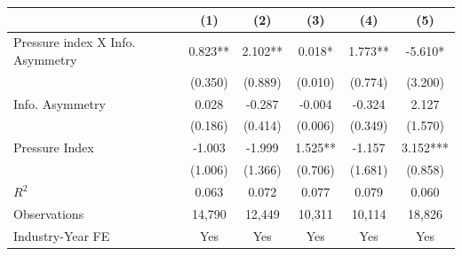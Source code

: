 {
\def\sym#1{\ifmmode^{#1}\else\(^{#1}\)\fi}
\begin{tabular}{l*{5}{c}}
\toprule
                    &\multicolumn{1}{c}{(1)}   &\multicolumn{1}{c}{(2)}   &\multicolumn{1}{c}{(3)}   &\multicolumn{1}{c}{(4)}   &\multicolumn{1}{c}{(5)}   \\
\midrule
Pressure index X Info. Asymmetry&       0.823** &       2.102** &       0.018*  &       1.773** &      -5.610*  \\
                    &     (0.350)   &     (0.889)   &     (0.010)   &     (0.774)   &     (3.200)   \\
\addlinespace
Info. Asymmetry     &       0.028   &      -0.287   &      -0.004   &      -0.324   &       2.127   \\
                    &     (0.186)   &     (0.414)   &     (0.006)   &     (0.349)   &     (1.570)   \\
\addlinespace
Pressure Index      &      -1.003   &      -1.999   &       1.525** &      -1.157   &       3.152***\\
                    &     (1.006)   &     (1.366)   &     (0.706)   &     (1.681)   &     (0.858)   \\
\midrule
\(R^{2}\)           &       0.063   &       0.072   &       0.077   &       0.079   &       0.060   \\
Observations        &      14,790   &      12,449   &      10,311   &      10,114   &      18,826   \\
Industry-Year FE    &         Yes   &         Yes   &         Yes   &         Yes   &         Yes   \\
\bottomrule
\end{tabular}
}
